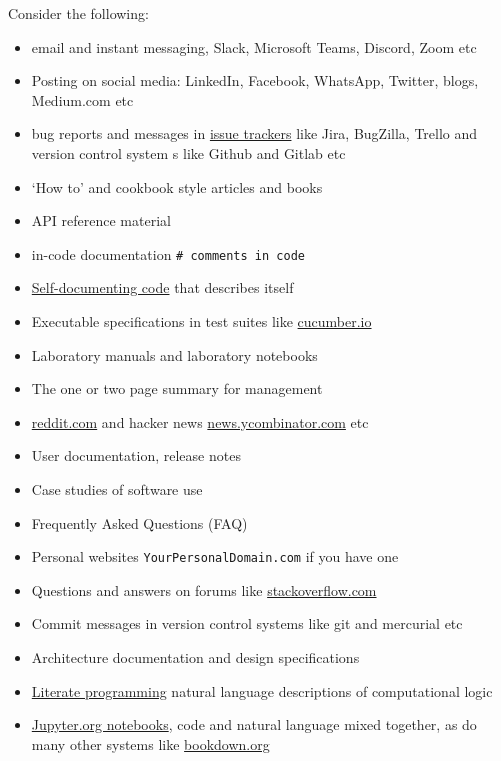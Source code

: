 \documentclass[
]{book}
\providecommand{\tightlist}{%
  \setlength{\itemsep}{0pt}\setlength{\parskip}{0pt}}
\begin{document}
Consider the following:

\begin{itemize}
\tightlist
\item
  email and instant messaging, Slack, Microsoft Teams, Discord, Zoom etc
\item
  Posting on social media: LinkedIn, Facebook, WhatsApp, Twitter, blogs, Medium.com etc
\item
  bug reports and messages in \href{https://en.wikipedia.org/wiki/Comparison_of_issue-tracking_systems}{issue trackers} like Jira, BugZilla, Trello and version control system s like Github and Gitlab etc
\item
  `How to' and cookbook style articles and books
\item
  API reference material
\item
  in-code documentation \texttt{\#\ comments\ in\ code}
\item
  \href{https://en.wikipedia.org/wiki/Self-documenting_code}{Self-documenting code} that describes itself
\item
  Executable specifications in test suites like \href{https://en.wikipedia.org/wiki/Cucumber_(software)}{cucumber.io}
\item
  Laboratory manuals and laboratory notebooks
\item
  The one or two page summary for management
\item
  \href{https://www.reddit.com/}{reddit.com} and hacker news \href{https://news.ycombinator.com/}{news.ycombinator.com} etc
\item
  User documentation, release notes
\item
  Case studies of software use
\item
  Frequently Asked Questions (FAQ)
\item
  Personal websites \texttt{YourPersonalDomain.com} if you have one
\item
  Questions and answers on forums like \href{https://stackoverflow.com/}{stackoverflow.com}
\item
  Commit messages in version control systems like git and mercurial etc
\item
  Architecture documentation and design specifications
\item
  \href{https://en.wikipedia.org/wiki/Literate_programming}{Literate programming} natural language descriptions of computational logic \citep{knuthlit}
\item
  \href{https://jupyter.org/}{Jupyter.org notebooks}, code and natural language mixed together, as do many other systems like \href{https://bookdown.org/}{bookdown.org}
\end{itemize}
\end{document}
